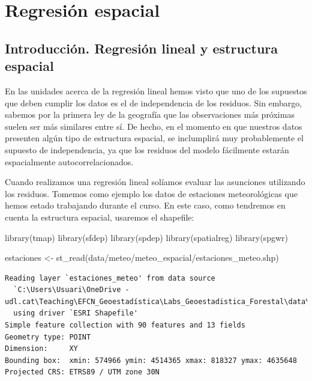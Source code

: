 \documentclass[
  letterpaper,
  DIV=11,
  numbers=noendperiod]{scrreprt}
\newenvironment{Shaded}{\begin{snugshade}}{\end{snugshade}}
\newcommand{\FunctionTok}[1]{\textcolor[rgb]{0.28,0.35,0.67}{#1}}
\newcommand{\NormalTok}[1]{\textcolor[rgb]{0.00,0.23,0.31}{#1}}
\newcommand{\OtherTok}[1]{\textcolor[rgb]{0.00,0.23,0.31}{#1}}
\newcommand{\StringTok}[1]{\textcolor[rgb]{0.13,0.47,0.30}{#1}}
\begin{document}
\hypertarget{sec-SpatReg}{%
\chapter{Regresión espacial}\label{sec-SpatReg}}

\hypertarget{introducciuxf3n.-regresiuxf3n-lineal-y-estructura-espacial}{%
\section{Introducción. Regresión lineal y estructura
espacial}\label{introducciuxf3n.-regresiuxf3n-lineal-y-estructura-espacial}}

En las unidades acerca de la regresión lineal hemos visto que uno de los
supuestos que deben cumplir los datos es el de independencia de los
residuos. Sin embargo, sabemos por la primera ley de la geografía que
las observaciones más próximas suelen ser más similares entre sí. De
hecho, en el momento en que nuestros datos presenten algún tipo de
estructura espacial, se inclumplirá muy probablemente el supuesto de
independencia, ya que los residuos del modelo fácilmente estarán
espacialmente autocorrelacionados.

Cuando realizamos una regresión lineal solíamos evaluar las asunciones
utilizando los residuos. Tomemos como ejemplo los datos de estaciones
meteorológicas que hemos estado trabajando durante el curso. En este
caso, como tendremos en cuenta la estructura espacial, usaremos el
shapefile:

\begin{Shaded}
\begin{Highlighting}[]
\FunctionTok{library}\NormalTok{(tmap)}
\FunctionTok{library}\NormalTok{(sfdep)}
\FunctionTok{library}\NormalTok{(spdep)}
\FunctionTok{library}\NormalTok{(spatialreg)}
\FunctionTok{library}\NormalTok{(spgwr)}


\NormalTok{estaciones }\OtherTok{\textless{}{-}} \FunctionTok{st\_read}\NormalTok{(}\StringTok{\textquotesingle{}data/meteo/meteo\_espacial/estaciones\_meteo.shp\textquotesingle{}}\NormalTok{) }
\end{Highlighting}
\end{Shaded}

\begin{verbatim}
Reading layer `estaciones_meteo' from data source 
  `C:\Users\Usuari\OneDrive - udl.cat\Teaching\EFCN_Geoestadística\Labs_Geoestadistica_Forestal\data\meteo\meteo_espacial\estaciones_meteo.shp' 
  using driver `ESRI Shapefile'
Simple feature collection with 90 features and 13 fields
Geometry type: POINT
Dimension:     XY
Bounding box:  xmin: 574966 ymin: 4514365 xmax: 818327 ymax: 4635648
Projected CRS: ETRS89 / UTM zone 30N
\end{verbatim}
\end{document}
